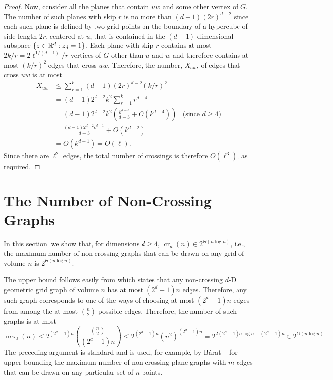 \documentclass{patmorin}
\DeclareMathOperator{\crs}{cr}
\DeclareMathOperator{\ncs}{ncs}
\begin{document}
\begin{proof}
  Now, consider all the planes that contain $uw$ and some other vertex
  of $G$.  The number of such planes with skip $r$ is no more than
  $(d-1)(2r)^{d-2}$ since each such plane is defined by two grid points on
  the boundary of a hypercube of side length $2r$, centered at $u$, that
  is contained in the $(d-1)$-dimensional subspace $\{z\in\mathbb{R}^d:z_d=1\}$.
  Each plane with skip $r$ contains at most $2k/r=2\ell^{1/(d-1)}/r$
  vertices of $G$ other than $u$ and $w$ and therefore contains at most
  $(k/r)^2$ edges that cross $uw$.  Therefore, the number, $X_{uw}$,
  of edges that cross $uw$ is at most
  \begin{align*}
     X_{uw} & \le \sum_{r=1}^k(d-1)(2r)^{d-2}(k/r)^2 \\
         & = (d-1)2^{d-2}k^2\sum_{r=1}^k r^{d-4} \\
         & = (d-1)2^{d-2}k^2\left(\frac{k^{d-3}}{d-3} 
             + O\left(k^{d-4}\right)\right) 
               & \text{(since $d\ge 4$)} \\
         & = \frac{(d-1)2^{d-2}k^{d-1}}{d-3} + O(k^{d-2}) \\
         & = O(k^{d-1}) = O(\ell).
  \end{align*}
  Since there are $\ell^2$ edges, the total number of crossings is
  therefore $O(\ell^3)$, as required.
\end{proof}

\section{The Number of Non-Crossing Graphs}

In this section, we show that, for dimensions $d\ge 4$, $\crs_d(n)\in
2^{\Theta(n\log n)}$, i.e., the maximum number of non-crossing graphs
that can be drawn on any grid of volume $n$ is $2^{\Theta(n\log n)}$.

The upper bound follows easily from  which states that
any non-crossing $d$-D geometric grid graph of volume $n$ has at most
$(2^d-1)n$ edges.  Therefore, any such graph corresponds to one of
the ways of choosing at most $(2^d-1)n$ edges from among the at most
$\binom{n}{2}$ possible edges.  Therefore, the number of such graphs is
at most
\[
  \ncs_d(n) \le 2^{(2^d-1)n}\binom{\binom{n}{2}}{(2^d-1)n} 
      \le 2^{(2^d-1)n} (n^{2})^{(2^d-1)n} 
      = 2^{2(2^d-1)n\log n+(2^d-1)n} 
      \in 2^{O(n\log n)} \enspace .
\]
The preceding argument is standard and is used, for example, by B\'arat
\etal~\cite[Lemma~4]{barat.matousek.ea:bounded-degree} for upper-bounding
the maximum number of non-crossing plane graphs with $m$ edges that can
be drawn on any particular set of $n$ points.
\end{document}
